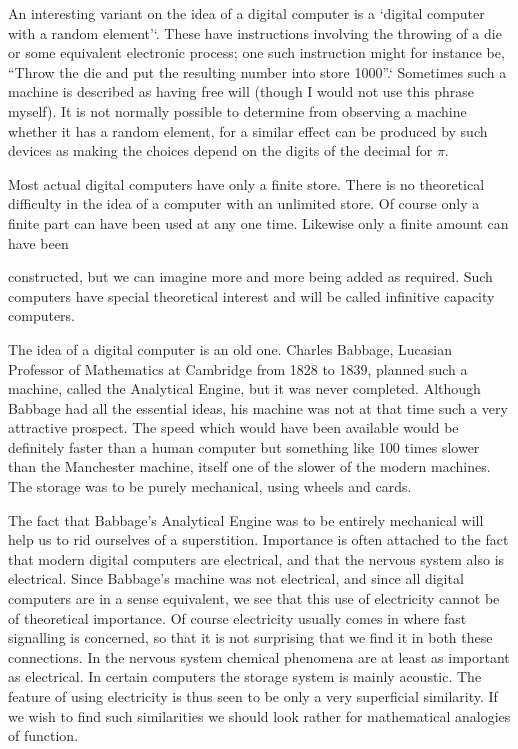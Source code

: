 \documentclass[10pt]{article} %
\begin{document}
An interesting variant on the idea of a digital computer is a `digital computer with a random element'`. These have instructions involving the throwing of a die or some equivalent electronic process; one such instruction might for instance be, ``Throw the die and put the resulting number into store 1000''.` Sometimes such a machine is described as having free will (though I would not use this phrase myself). It is not normally possible to determine from observing a machine whether it has a random element, for a similar effect can be produced by such devices as making the choices depend on the digits of the decimal for $\pi$.

Most actual digital computers have only a finite store. There is no theoretical difficulty in the idea of a computer with an unlimited store. Of course only a finite part can have been used at any one time. Likewise only a finite amount can have been

constructed, but we can imagine more and more being added as required. Such computers have special theoretical interest and will be called infinitive capacity computers.

The idea of a digital computer is an old one. Charles Babbage, Lucasian Professor of Mathematics at Cambridge from 1828 to 1839, planned such a machine, called the Analytical Engine, but it was never completed. Although Babbage had all the essential ideas, his machine was not at that time such a very attractive prospect. The speed which would have been available would be definitely faster than a human computer but something like 100 times slower than the Manchester machine, itself one of the slower of the modern machines. The storage was to be purely mechanical, using wheels and cards.

The fact that Babbage's Analytical Engine was to be entirely mechanical will help us to rid ourselves of a superstition. Importance is often attached to the fact that modern digital computers are electrical, and that the nervous system also is electrical. Since Babbage's machine was not electrical, and since all digital computers are in a sense equivalent, we see that this use of electricity cannot be of theoretical importance. Of course electricity usually comes in where fast signalling is concerned, so that it is not surprising that we find it in both these connections. In the nervous system chemical phenomena are at least as important as electrical. In certain computers the storage system is mainly acoustic. The feature of using electricity is thus seen to be only a very superficial similarity. If we wish to find such similarities we should look rather for mathematical analogies of function.
\end{document}
